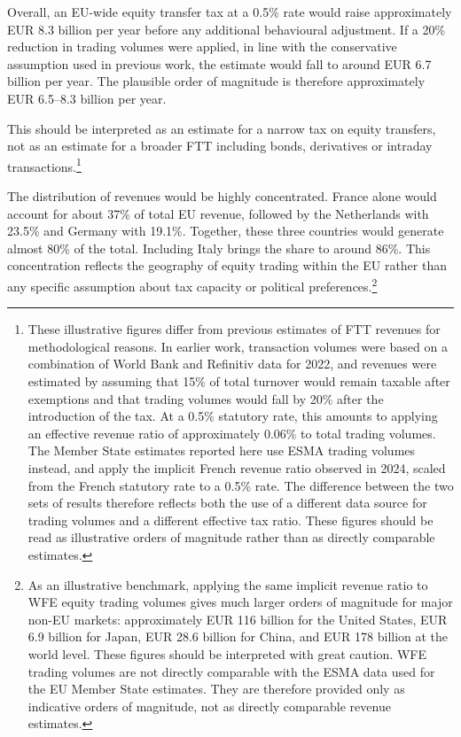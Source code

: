 \documentclass[../../main]{subfiles}
\begin{document}
Overall, an EU-wide equity transfer tax at a 0.5\% rate would raise approximately EUR 8.3 billion per year before any additional behavioural adjustment. If a 20\% reduction in trading volumes were applied, in line with the conservative assumption used in previous work, the estimate would fall to around EUR 6.7 billion per year. The plausible order of magnitude is therefore approximately EUR 6.5--8.3 billion per year.

This should be interpreted as an estimate for a narrow tax on equity transfers, not as an estimate for a broader FTT including bonds, derivatives or intraday transactions.\footnote{These illustrative figures differ from previous estimates of FTT revenues \citep{CapelleBlancardPersaud2025} for methodological reasons. In earlier work, transaction volumes were based on a combination of World Bank and Refinitiv data for 2022, and revenues were estimated by assuming that 15\% of total turnover would remain taxable after exemptions and that trading volumes would fall by 20\% after the introduction of the tax. At a 0.5\% statutory rate, this amounts to applying an effective revenue ratio of approximately 0.06\% to total trading volumes. The Member State estimates reported here use ESMA trading volumes instead, and apply the implicit French revenue ratio observed in 2024, scaled from the French statutory rate to a 0.5\% rate. The difference between the two sets of results therefore reflects both the use of a different data source for trading volumes and a different effective tax ratio. These figures should be read as illustrative orders of magnitude rather than as directly comparable estimates.}

The distribution of revenues would be highly concentrated. France alone would account for about 37\% of total EU revenue, followed by the Netherlands with 23.5\% and Germany with 19.1\%. Together, these three countries would generate almost 80\% of the total. Including Italy brings the share to around 86\%. This concentration reflects the geography of equity trading within the EU rather than any specific assumption about tax capacity or political preferences.\footnote{As an illustrative benchmark, applying the same implicit revenue ratio to WFE equity trading volumes gives much larger orders of magnitude for major non-EU markets: approximately EUR 116 billion for the United States, EUR 6.9 billion for Japan, EUR 28.6 billion for China, and EUR 178 billion at the world level. These figures should be interpreted with great caution. WFE trading volumes are not directly comparable with the ESMA data used for the EU Member State estimates. They are therefore provided only as indicative orders of magnitude, not as directly comparable revenue estimates.}
\end{document}

